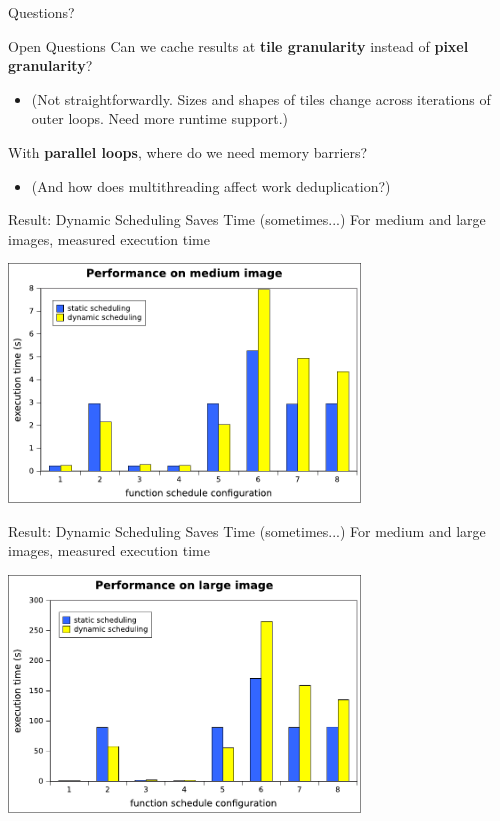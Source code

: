 \documentclass[xcolor=dvipsnames]{beamer}
\begin{document}
\begin{frame}{Questions?}
\end{frame}


\begin{frame}{Open Questions}
	Can we cache results at {\bf tile granularity} instead of {\bf pixel granularity}?
	\begin{itemize}
		\item (Not straightforwardly. Sizes and shapes of tiles change across iterations of outer loops. Need more runtime support.)
	\end{itemize}
	\linegap

	With {\bf parallel loops}, where do we need memory barriers?
	\begin{itemize}
		\item (And how does multithreading affect work deduplication?)
	\end{itemize}
	\linegap

\end{frame}

\begin{frame}{Result: Dynamic Scheduling Saves Time (sometimes...)}
	For medium and large images, measured execution time

	\begin{center}
	\includegraphics[width=0.7\textwidth]{graphs/medium.pdf}
	\end{center}
\end{frame}

\begin{frame}{Result: Dynamic Scheduling Saves Time (sometimes...)}
	For medium and large images, measured execution time

	\begin{center}
	\includegraphics[width=0.7\textwidth]{graphs/large.pdf}
	\end{center}
\end{frame}
\end{document}
